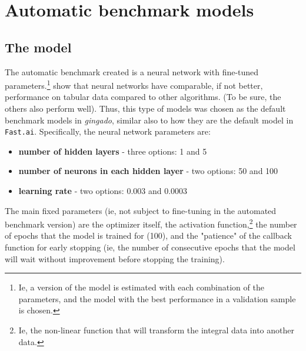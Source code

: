 \documentclass{article}
\begin{document}
\section{Automatic benchmark models}\label{benchmark}

\subsection{The model}
The automatic benchmark created is a neural network with fine-tuned parameters.\footnote{Ie, a version of the model is estimated with each combination of the parameters, and the model with the best performance in a validation sample is chosen.} \cite{TabularDeepLearning} show that neural networks have comparable, if not better, performance on tabular data compared to other algorithms. (To be sure, the others also perform well). Thus, this type of models was chosen as the default benchmark models in \textit{gingado}, similar also to how they are the default model in \texttt{Fast.ai}. Specifically, the neural network parameters are:

\begin{itemize}
    \item \textbf{number of hidden layers} - three options: 1 and 5
    \item \textbf{number of neurons in each hidden layer} - two options: 50 and 100
    \item \textbf{learning rate} - two options: 0.003 and 0.0003
\end{itemize}

The main fixed parameters (ie, not subject to fine-tuning in the automated benchmark version) are the optimizer itself, the activation function,\footnote{Ie, the non-linear function that will transform the integral data into another data.} the number of epochs that the model is trained for (100), and the "patience"  of the callback function for early stopping (ie, the number of consecutive epochs that the model will wait without improvement before stopping the training).


\end{document}
